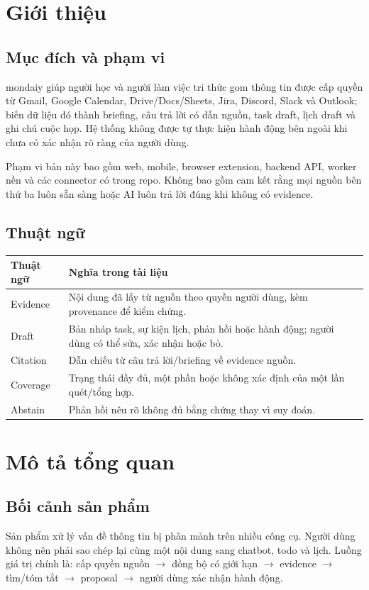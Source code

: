 \documentclass[11pt,a4paper]{article}
\begin{document}
\section{Giới thiệu}
\subsection{Mục đích và phạm vi}
mondaiy giúp người học và người làm việc tri thức gom thông tin được cấp quyền từ Gmail, Google Calendar, Drive/Docs/Sheets, Jira, Discord, Slack và Outlook; biến dữ liệu đó thành briefing, câu trả lời có dẫn nguồn, task draft, lịch draft và ghi chú cuộc họp. Hệ thống không được tự thực hiện hành động bên ngoài khi chưa có xác nhận rõ ràng của người dùng.

Phạm vi bản này bao gồm web, mobile, browser extension, backend API, worker nền và các connector có trong repo. Không bao gồm cam kết rằng mọi nguồn bên thứ ba luôn sẵn sàng hoặc AI luôn trả lời đúng khi không có evidence.

\subsection{Thuật ngữ}
\begin{longtable}{p{3cm}p{11cm}}
\toprule Thuật ngữ & Nghĩa trong tài liệu \\ \midrule\endhead
Evidence & Nội dung đã lấy từ nguồn theo quyền người dùng, kèm provenance để kiểm chứng. \\
Draft & Bản nháp task, sự kiện lịch, phản hồi hoặc hành động; người dùng có thể sửa, xác nhận hoặc bỏ. \\
Citation & Dẫn chiếu từ câu trả lời/briefing về evidence nguồn. \\
Coverage & Trạng thái đầy đủ, một phần hoặc không xác định của một lần quét/tổng hợp. \\
Abstain & Phản hồi nêu rõ không đủ bằng chứng thay vì suy đoán. \\
\bottomrule
\end{longtable}

\section{Mô tả tổng quan}
\subsection{Bối cảnh sản phẩm}
Sản phẩm xử lý vấn đề thông tin bị phân mảnh trên nhiều công cụ. Người dùng không nên phải sao chép lại cùng một nội dung sang chatbot, todo và lịch. Luồng giá trị chính là: cấp quyền nguồn $\rightarrow$ đồng bộ có giới hạn $\rightarrow$ evidence $\rightarrow$ tìm/tóm tắt $\rightarrow$ proposal $\rightarrow$ người dùng xác nhận hành động.
\end{document}
